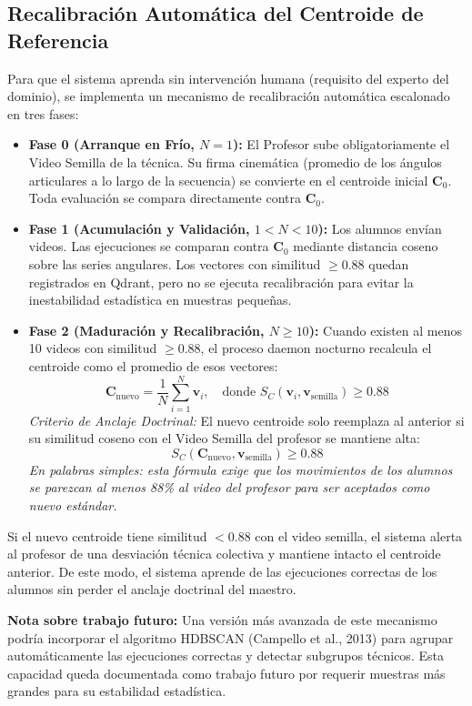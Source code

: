 \documentclass[12pt,letterpaper]{article}
\begin{document}
\subsection{Recalibración Automática del Centroide de Referencia}

Para que el sistema aprenda sin intervención humana (requisito del experto del dominio), se implementa un mecanismo de recalibración automática escalonado en tres fases:

\begin{itemize}
    \item \textbf{Fase 0 (Arranque en Frío, $N = 1$):} El Profesor sube obligatoriamente el Video Semilla de la técnica. Su firma cinemática (promedio de los ángulos articulares a lo largo de la secuencia) se convierte en el centroide inicial $\mathbf{C}_0$. Toda evaluación se compara directamente contra $\mathbf{C}_0$.
    \item \textbf{Fase 1 (Acumulación y Validación, $1 < N < 10$):} Los alumnos envían videos. Las ejecuciones se comparan contra $\mathbf{C}_0$ mediante distancia coseno sobre las series angulares. Los vectores con similitud $\geq 0.88$ quedan registrados en Qdrant, pero no se ejecuta recalibración para evitar la inestabilidad estadística en muestras pequeñas.
    \item \textbf{Fase 2 (Maduración y Recalibración, $N \ge 10$):} Cuando existen al menos 10 videos con similitud $\geq 0.88$, el proceso daemon nocturno recalcula el centroide como el promedio de esos vectores:
\[
\mathbf{C}_{\text{nuevo}} = \frac{1}{N} \sum_{i=1}^{N} \mathbf{v}_i, \quad \text{donde } S_C(\mathbf{v}_i, \mathbf{v}_{\text{semilla}}) \geq 0.88
\]
\textit{Criterio de Anclaje Doctrinal:} El nuevo centroide solo reemplaza al anterior si su similitud coseno con el Video Semilla del profesor se mantiene alta:
\[
S_C(\mathbf{C}_{\text{nuevo}}, \mathbf{v}_{\text{semilla}}) \geq 0.88
\]
\textit{En palabras simples: esta fórmula exige que los movimientos de los alumnos se parezcan al menos 88\% al video del profesor para ser aceptados como nuevo estándar.}
\end{itemize}

Si el nuevo centroide tiene similitud $< 0.88$ con el video semilla, el sistema alerta al profesor de una desviación técnica colectiva y mantiene intacto el centroide anterior. De este modo, el sistema aprende de las ejecuciones correctas de los alumnos sin perder el anclaje doctrinal del maestro.

\textbf{Nota sobre trabajo futuro:} Una versión más avanzada de este mecanismo podría incorporar el algoritmo HDBSCAN (Campello et al., 2013) para agrupar automáticamente las ejecuciones correctas y detectar subgrupos técnicos. Esta capacidad queda documentada como trabajo futuro por requerir muestras más grandes para su estabilidad estadística.
\end{document}
